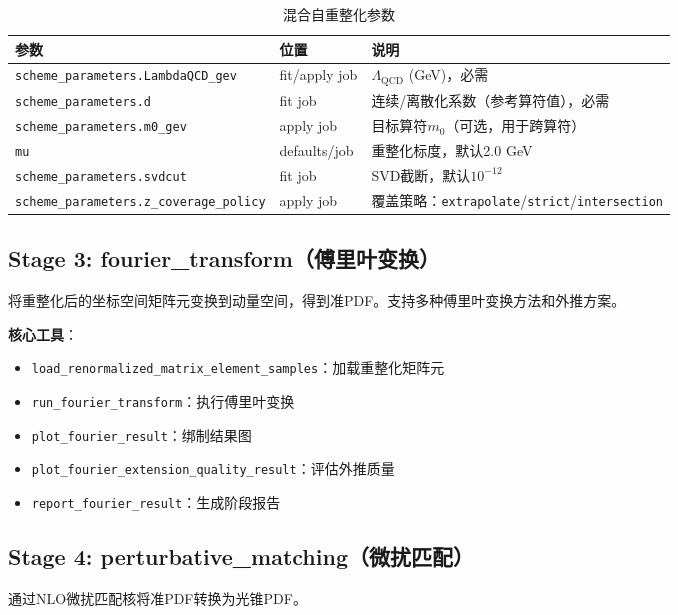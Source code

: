 \documentclass[12pt,a4paper]{ctexart}
\begin{document}
\begin{table}[H]
\centering
\caption{混合自重整化参数}
\label{tab:self_renorm_params}
\begin{tabular}{@{}llp{6cm}@{}}
\toprule
\textbf{参数} & \textbf{位置} & \textbf{说明} \\
\midrule
\texttt{scheme\_parameters.LambdaQCD\_gev} & fit/apply job & $\Lambda_{\mathrm{QCD}}$ (GeV)，必需 \\
\texttt{scheme\_parameters.d} & fit job & 连续/离散化系数（参考算符值），必需 \\
\texttt{scheme\_parameters.m0\_gev} & apply job & 目标算符$m_0$（可选，用于跨算符） \\
\texttt{mu} & defaults/job & 重整化标度，默认2.0 GeV \\
\texttt{scheme\_parameters.svdcut} & fit job & SVD截断，默认$10^{-12}$ \\
\texttt{scheme\_parameters.z\_coverage\_policy} & apply job & 覆盖策略：\texttt{extrapolate}/\texttt{strict}/\texttt{intersection} \\
\bottomrule
\end{tabular}
\end{table}

\subsection{Stage 3: fourier\_transform（傅里叶变换）}

将重整化后的坐标空间矩阵元变换到动量空间，得到准PDF。支持多种傅里叶变换方法和外推方案。

\textbf{核心工具}：
\begin{itemize}[leftmargin=*]
    \item \texttt{load\_renormalized\_matrix\_element\_samples}：加载重整化矩阵元
    \item \texttt{run\_fourier\_transform}：执行傅里叶变换
    \item \texttt{plot\_fourier\_result}：绑制结果图
    \item \texttt{plot\_fourier\_extension\_quality\_result}：评估外推质量
    \item \texttt{report\_fourier\_result}：生成阶段报告
\end{itemize}

\subsection{Stage 4: perturbative\_matching（微扰匹配）}

通过NLO微扰匹配核将准PDF转换为光锥PDF。
\end{document}
